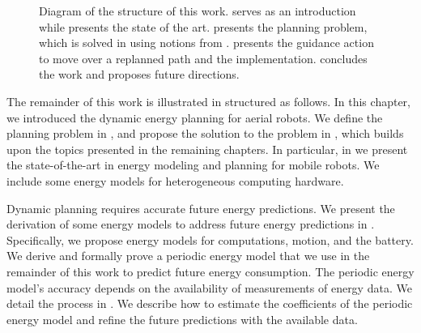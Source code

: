 \begin{figure}[!h]
  \caption[Diagram of the structure]{Diagram of the structure of this work.  serves as an introduction while  presents the state of the art.  presents the planning problem, which is solved in  using notions from .  presents the guidance action to move over a replanned path and  the implementation.  concludes the work and proposes future directions.}
  \label{fig:structure}
\end{figure}

The remainder of this work is illustrated in  structured as follows. In this chapter, we introduced the dynamic energy planning for aerial robots. We define the planning problem in , and propose the solution to the problem in , which builds upon the topics presented in the remaining chapters. In particular, in  we present the state-of-the-art in energy modeling and planning for mobile robots. We include some energy models for heterogeneous computing hardware.

Dynamic planning requires accurate future energy predictions. We present the derivation of some energy models to address future energy predictions in . Specifically, we propose energy models for computations, motion, and the battery. We derive and formally prove a periodic energy model that we use in the remainder of this work to predict future energy consumption. The periodic energy model's accuracy depends on the availability of measurements of energy data. We detail the process in . We describe how to estimate the coefficients of the periodic energy model and refine the future predictions with the available data.

